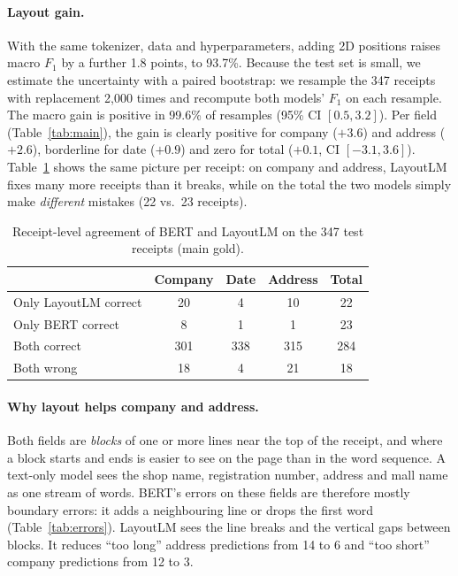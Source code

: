 \paragraph{Layout gain.} With the same tokenizer, data and
hyperparameters, adding 2D positions raises macro $F_1$ by a further 1.8
points, to 93.7\%. Because the test set is small, we estimate the
uncertainty with a paired bootstrap: we resample the 347 receipts with
replacement 2{,}000 times and recompute both models' $F_1$ on each
resample. The macro gain is positive in 99.6\% of resamples (95\% CI
$[0.5, 3.2]$). Per field (Table~\ref{tab:main}), the gain is clearly
positive for company ($+3.6$) and address ($+2.6$), borderline for date
($+0.9$) and zero for total ($+0.1$, CI $[-3.1, 3.6]$).
Table~\ref{tab:wins} shows the same picture per receipt: on company and
address, LayoutLM fixes many more receipts than it breaks, while on the
total the two models simply make \emph{different} mistakes (22 vs.\ 23
receipts).

\begin{table}[t]
  \centering
  \small
  \begin{tabular}{lcccc}
    \toprule
     & Company & Date & Address & Total \\
    \midrule
    Only LayoutLM correct & 20 & 4 & 10 & 22 \\
    Only BERT correct     &  8 & 1 &  1 & 23 \\
    Both correct          & 301 & 338 & 315 & 284 \\
    Both wrong            & 18 & 4 & 21 & 18 \\
    \bottomrule
  \end{tabular}
  \caption{Receipt-level agreement of BERT and LayoutLM on the 347 test
  receipts (main gold).}
  \label{tab:wins}
\end{table}

\paragraph{Why layout helps company and address.} Both fields are
\emph{blocks} of one or more lines near the top of the receipt, and
where a block starts and ends is easier to see on the page than in the
word sequence. A text-only model sees the shop name, registration
number, address and mall name as one stream of words. BERT's errors on
these fields are therefore mostly boundary errors: it adds a
neighbouring line or drops the first word (Table~\ref{tab:errors}).
LayoutLM sees the line breaks and the vertical gaps between blocks. It
reduces ``too long'' address predictions from 14 to 6 and ``too short''
company predictions from 12 to 3.

